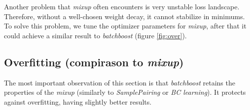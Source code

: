 \documentclass{article}
\begin{document}
Another problem that \emph{mixup} often encounters is very unstable loss
landscape. Therefore, without a well-chosen weight decay, it cannot stabilize in
minimums. To solve this problem, we tune the optimizer parameters
for \emph{mixup}, after that it could achieve a similar result to
\emph{batchboost} (figure \ref{fig:over}).

\subsection{Overfitting (compirason to \emph{mixup})}
\label{sec:over}

The most important observation of this section is that \emph{batchboost} retains
the properties of the \emph{mixup} (similarly to \emph{SamplePairing} or
\emph{BC learning}). It protects against overfitting, having slightly better results.
\end{document}
